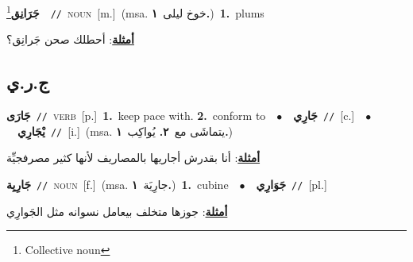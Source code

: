 \documentclass[10pt,a4paper,twoside]{article} %
\begin{document}
\begin{multicols}{2}
{\setlength\topsep{0pt}\textbf{\foreignlanguage{arabic}{جَرَانِق}}\footnote{Collective noun}\ \ {\color{gray}\texttt{//}\color{black}}\ \textsc{noun}\ [m.]\ \color{gray}(msa. \foreignlanguage{arabic}{خوخ ليلى}~\foreignlanguage{arabic}{\textbf{١.}})\color{black}\ \textbf{1.}~plums\  \begin{flushright}\color{gray}\foreignlanguage{arabic}{\textbf{\underline{\foreignlanguage{arabic}{أمثلة}}}: أحطلك صحن جَرانِق؟}\end{flushright}\color{black}} \vspace{2mm}

\vspace{-3mm}
\subsection*{\color{blue}\foreignlanguage{arabic}{ج.ر.ي}\color{blue}{}} 

{\setlength\topsep{0pt}\textbf{\foreignlanguage{arabic}{جَارَى}}\ {\color{gray}\texttt{//}\color{black}}\ \textsc{verb}\ [p.]\ \textbf{1.}~keep pace with.  \textbf{2.}~conform to\ \ $\bullet$\ \ \setlength\topsep{0pt}\textbf{\foreignlanguage{arabic}{جَارِي}}\ {\color{gray}\texttt{//}\color{black}}\ [c.]\ \ $\bullet$\ \ \setlength\topsep{0pt}\textbf{\foreignlanguage{arabic}{يْجَارِي}}\ {\color{gray}\texttt{//}\color{black}}\ [i.]\ \color{gray}(msa. \foreignlanguage{arabic}{يتماشَى مع}~\foreignlanguage{arabic}{\textbf{٢.}}  \foreignlanguage{arabic}{يُواكِب}~\foreignlanguage{arabic}{\textbf{١.}})\color{black}\  \begin{flushright}\color{gray}\foreignlanguage{arabic}{\textbf{\underline{\foreignlanguage{arabic}{أمثلة}}}: أنا بقدرش أجاريها بالمصاريف لأنها كثير مصرفجيِّة}\end{flushright}\color{black}} \vspace{2mm}

{\setlength\topsep{0pt}\textbf{\foreignlanguage{arabic}{جَارِيِة}}\ {\color{gray}\texttt{//}\color{black}}\ \textsc{noun}\ [f.]\ \color{gray}(msa. \foreignlanguage{arabic}{جارِيَة}~\foreignlanguage{arabic}{\textbf{١.}})\color{black}\ \textbf{1.}~cubine\ \ $\bullet$\ \ \setlength\topsep{0pt}\textbf{\foreignlanguage{arabic}{جَوَارِي}}\ {\color{gray}\texttt{//}\color{black}}\ [pl.]\  \begin{flushright}\color{gray}\foreignlanguage{arabic}{\textbf{\underline{\foreignlanguage{arabic}{أمثلة}}}: جوزها متخلف بيعامل نسوانه مثل الجَوارِي}\end{flushright}\color{black}} \vspace{2mm}


\end{multicols}
\end{document}
